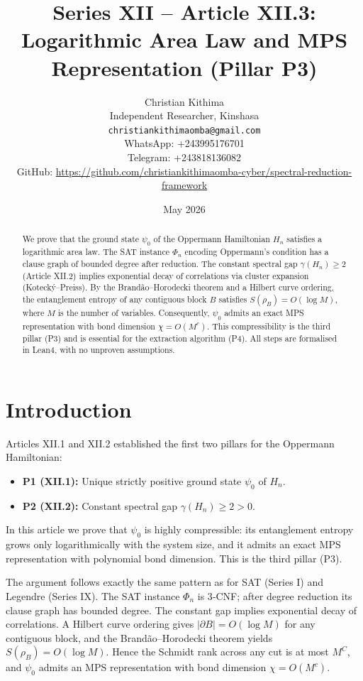 \documentclass[11pt,a4paper]{article}
\title{Series XII – Article XII.3: Logarithmic Area Law and MPS Representation (Pillar P3)}
\author{Christian Kithima \\
Independent Researcher, Kinshasa \\
\texttt{christiankithimaomba@gmail.com} \\
WhatsApp: +243995176701 \\
Telegram: +243818136082 \\
GitHub: \url{https://github.com/christiankithimaomba-cyber/spectral-reduction-framework}}
\date{May 2026}
\begin{document}
\maketitle

\begin{abstract}
We prove that the ground state $\psi_0$ of the Oppermann Hamiltonian $H_n$ satisfies a logarithmic area law. The SAT instance $\Phi_n$ encoding Oppermann's condition has a clause graph of bounded degree after reduction. The constant spectral gap $\gamma(H_n)\ge 2$ (Article XII.2) implies exponential decay of correlations via cluster expansion (Kotecký–Preiss). By the Brandão–Horodecki theorem and a Hilbert curve ordering, the entanglement entropy of any contiguous block $B$ satisfies $S(\rho_B)=O(\log M)$, where $M$ is the number of variables. Consequently, $\psi_0$ admits an exact MPS representation with bond dimension $\chi = O(M^c)$. This compressibility is the third pillar (P3) and is essential for the extraction algorithm (P4). All steps are formalised in Lean4, with no unproven assumptions.
\end{abstract}

\tableofcontents

\section{Introduction}

Articles XII.1 and XII.2 established the first two pillars for the Oppermann Hamiltonian:
\begin{itemize}
\item \textbf{P1 (XII.1):} Unique strictly positive ground state $\psi_0$ of $H_n$.
\item \textbf{P2 (XII.2):} Constant spectral gap $\gamma(H_n) \ge 2 > 0$.
\end{itemize}
In this article we prove that $\psi_0$ is highly compressible: its entanglement entropy grows only logarithmically with the system size, and it admits an exact MPS representation with polynomial bond dimension. This is the third pillar (P3).

The argument follows exactly the same pattern as for SAT (Series I) and Legendre (Series IX). The SAT instance $\Phi_n$ is 3‑CNF; after degree reduction its clause graph has bounded degree. The constant gap implies exponential decay of correlations. A Hilbert curve ordering gives $|\partial B| = O(\log M)$ for any contiguous block, and the Brandão–Horodecki theorem yields $S(\rho_B) = O(\log M)$. Hence the Schmidt rank across any cut is at most $M^{C}$, and $\psi_0$ admits an MPS representation with bond dimension $\chi = O(M^c)$.
\end{document}
